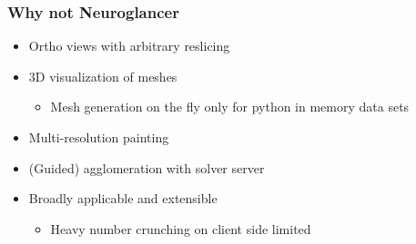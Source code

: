 \documentclass[aspectratio=169]{beamer}
\newcommand{\cmark}{\ding{51}}%
\newcommand{\xmark}{\ding{55}}%
\begin{document}
\begin{frame}
    \frametitle{Why not Neuroglancer}
    \begin{itemize}
          \item<1->[\color{green}\cmark] Ortho views with arbitrary reslicing
          \item<2->[\only<2>{\color{green}\cmark}\only<3->{\color{yellow}\cmark}] 3D visualization of meshes
        \begin{itemize}
              \item<3->[\color{red}\xmark] Mesh generation on the fly only for python in memory data sets
        \end{itemize}
          \item<4->[\color{red}\xmark] Multi-resolution painting
          \item<5->[\color{red}\xmark] (Guided) agglomeration with solver server
          \item<6->[\only<6>{\color{green}\cmark}\only<7->{\color{yellow}\cmark}] Broadly applicable and extensible
        \begin{itemize}
              \item<7->[\color{red}\xmark] Heavy number crunching on client side limited \\ 
        \end{itemize}
    \end{itemize}
\end{frame}


\end{document}
